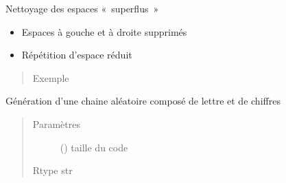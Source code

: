 \documentclass[letterpaper,10pt,french]{sphinxmanual}
\begin{document}
\begin{fulllineitems}
\label{\detokenize{modules/tools:toolbox.tools.clean_space}}
Nettoyage des espaces « superflus »
\begin{itemize}
\item {} 
Espaces à gouche et à droite supprimés

\item {} 
Répétition d’espace réduit

\end{itemize}
\begin{quote}\begin{description}
\item[{Exemple}] \leavevmode
\begin{sphinxVerbatim}[commandchars=\\\{\}]
  
 
\end{sphinxVerbatim}

\end{description}\end{quote}

\end{fulllineitems}


\begin{fulllineitems}
\label{\detokenize{modules/tools:toolbox.tools.code_maker}}
Génération d’une chaine aléatoire composé de lettre et de chiffres
\begin{quote}\begin{description}
\item[{Paramètres}] \leavevmode
{} () \textendash{} taille du code

\item[{Rtype str}] \leavevmode
\end{description}\end{quote}

\end{fulllineitems}
\end{document}
